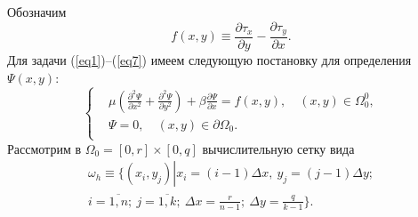 \documentclass[press]{vestnik}
\begin{document}
Обозначим 
\begin{equation}
\label{eq12}
f\left( {x,y} \right)\equiv \frac{\partial \tau_{x} }{\partial 
y}-\frac{\partial \tau_{y} }{\partial x}.
\end{equation}
Для задачи (\ref{eq1})--(\ref{eq7}) имеем следующую постановку для определения $\Psi \left( 
{x,y} \right)$:
\begin{equation}
\label{eq13}
\left\{ {\begin{aligned}
 &\mu \left( {\frac{\partial^{2}\Psi }{\partial x^{2}}+\frac{\partial 
^{2}\Psi }{\partial y^{2}}} \right)+\beta \frac{\partial \Psi }{\partial 
x}=f\left( {x,y} \right),\quad(x,y)\in \Omega^{0}_{0} , \\ 
 &\Psi =0,\quad (x,y)\in \partial \Omega_{0} . \\ 
 \end{aligned}} \right.
\end{equation}
Рассмотрим в $\Omega_{0} =\left[ {0,r} \right]\times \left[ {0,q} \right]$ вычислительную сетку вида
\begin{multline}\label{14}
 \omega_{h} \equiv \biggl\{ \left. (x_{i} ,y_{j}) \right| x_{i} =(i-1) \Delta x,\ y_{j} =(j-1) \Delta y;  \\ 
i=\overline {1,n} ;\ j=\overline {1,k} ;\ \Delta x=\frac{r}{n-1};\  \Delta y=\frac{q}{k-1} \Bigr\} .
\end{multline}
\end{document}
